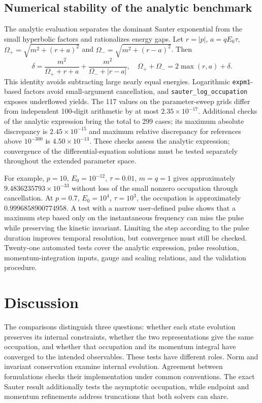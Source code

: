 \documentclass[11pt,a4paper]{article}
\begin{document}
\subsection{Numerical stability of the analytic benchmark}
The analytic evaluation separates the dominant Sauter exponential from the small hyperbolic factors and rationalizes energy gaps. Let $r=|p|$, $a=qE_0\tau$, $\Omega_+=\sqrt{m^2+(r+a)^2}$ and $\Omega_-=\sqrt{m^2+(r-a)^2}$. Then
\begin{equation}
\delta=\frac{m^2}{\Omega_++r+a}+\frac{m^2}{\Omega_-+|r-a|},\quad
\Omega_++\Omega_-=2\max(r,a)+\delta.
\end{equation}
This identity avoids subtracting large nearly equal energies. Logarithmic \texttt{expm1}-based factors avoid small-argument cancellation, and \texttt{sauter\_log\_occupation} exposes underflowed yields. The 117 values on the parameter-sweep grids differ from independent 100-digit arithmetic by at most $2.35\times10^{-17}$. Additional checks of the analytic expression bring the total to 299 cases; its maximum absolute discrepancy is $2.45\times10^{-15}$ and maximum relative discrepancy for references above $10^{-300}$ is $4.50\times10^{-13}$. These checks assess the analytic expression; convergence of the differential-equation solutions must be tested separately throughout the extended parameter space.

For example, $p=10$, $E_0=10^{-12}$, $\tau=0.01$, $m=q=1$ gives approximately $9.4836235793\times10^{-33}$ without loss of the small nonzero occupation through cancellation. At $p=0.7$, $E_0=10^4$, $\tau=10^3$, the occupation is approximately $0.9996858900774958$. A test with a narrow user-defined pulse shows that a maximum step based only on the instantaneous frequency can miss the pulse while preserving the kinetic invariant. Limiting the step according to the pulse duration improves temporal resolution, but convergence must still be checked. Twenty-one automated tests cover the analytic expression, pulse resolution, momentum-integration inputs, gauge and scaling relations, and the validation procedure.


\section{Discussion}
\label{sec:discussion}

The comparisons distinguish three questions: whether each state evolution preserves its internal constraints, whether the two representations give the same occupation, and whether that occupation and its momentum integral have converged to the intended observables. These tests have different roles. Norm and invariant conservation examine internal evolution. Agreement between formulations checks their implementation under common conventions. The exact Sauter result additionally tests the asymptotic occupation, while endpoint and momentum refinements address truncations that both solvers can share.
\end{document}
